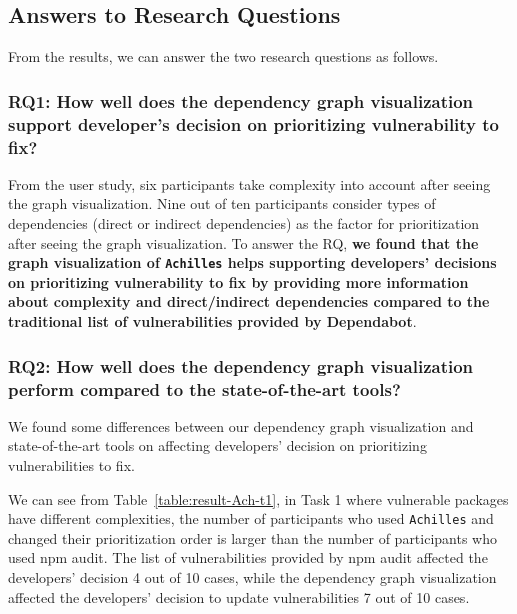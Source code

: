 \documentclass[conference]{IEEEtran}
\begin{document}
	
	\subsection{Answers to Research Questions}
	From the results, we can answer the two research questions as follows.
	
	\subsubsection{RQ1: How well does the dependency graph visualization support developer’s decision on prioritizing vulnerability to fix?}
	From the user study, six participants take complexity into account after seeing the graph visualization. Nine out of ten participants consider types of dependencies (direct or indirect dependencies) as the factor for prioritization after seeing the graph visualization.
	To answer the RQ, \textbf{we found that the graph visualization of \texttt{Achilles} helps supporting developers' decisions on prioritizing vulnerability to fix by providing more information about complexity and direct/indirect dependencies compared to the traditional list of vulnerabilities provided by Dependabot}.
	
	\subsubsection{RQ2: How well does the dependency graph visualization perform compared to the state-of-the-art tools?}
	
	We found some differences between our dependency graph visualization and state-of-the-art tools on affecting developers' decision on prioritizing vulnerabilities to fix. 
	
	We can see from Table~\ref{table:result-Ach-t1}, in Task 1 where vulnerable packages have different complexities, the number of participants who used \texttt{Achilles} and changed their prioritization order is larger than the number of participants who used npm audit. The list of vulnerabilities provided by npm audit affected the developers' decision 4 out of 10 cases, while the dependency graph visualization affected the developers' decision to update vulnerabilities 7 out of 10 cases. %
	
\end{document}
